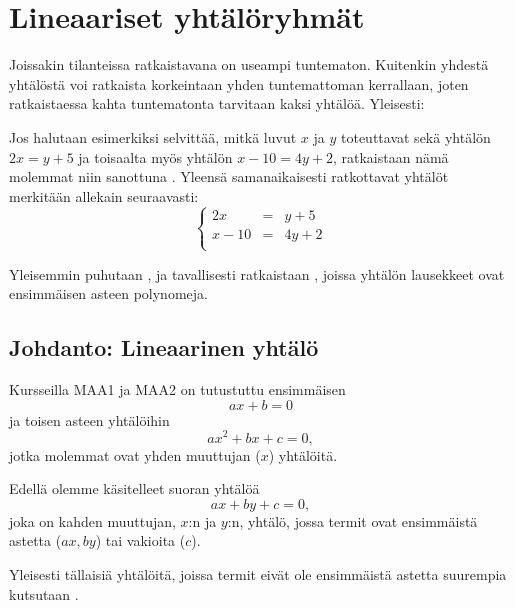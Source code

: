 \section{Lineaariset yhtälöryhmät} 

Joissakin tilanteissa ratkaistavana on useampi tuntematon. Kuitenkin yhdestä yhtälöstä voi ratkaista korkeintaan yhden tuntemattoman kerrallaan, joten ratkaistaessa kahta tuntematonta tarvitaan kaksi yhtälöä. Yleisesti:


Jos halutaan esimerkiksi selvittää, mitkä luvut $x$ ja $y$ toteuttavat sekä yhtälön $2x=y+5$ ja toisaalta 
myös yhtälön $x-10=4y+2$, ratkaistaan nämä molemmat niin sanottuna . Yleensä samanaikaisesti ratkottavat yhtälöt merkitään allekain seuraavasti:
$$\left\{    
    \begin{array}{rcl}
        2x&=&y+5 \\
        x-10&=&4y+2 \\
    \end{array}
    \right.$$
    
Yleisemmin puhutaan , ja tavallisesti ratkaistaan , joissa yhtälön lausekkeet ovat ensimmäisen asteen polynomeja.


\subsection*{Johdanto: Lineaarinen yhtälö}

Kursseilla MAA1 ja MAA2 on tutustuttu ensimmäisen 
\[ax +b = 0\]
ja toisen asteen yhtälöihin
\[ax^2 + bx +c = 0,\]
jotka molemmat ovat yhden muuttujan ($x$) yhtälöitä.

Edellä olemme käsitelleet suoran yhtälöä
\[ax + by + c = 0,\]
joka on kahden muuttujan, $x$:n ja $y$:n, yhtälö, jossa termit ovat ensimmäistä astetta ($ax, by$) tai vakioita ($c$).

Yleisesti tällaisiä yhtälöitä, joissa termit eivät ole ensimmäistä astetta suurempia kutsutaan .

